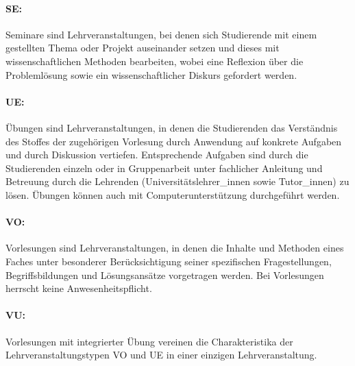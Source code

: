 \paragraph{SE:} Seminare sind Lehrveranstaltungen, bei denen sich
Studierende mit einem gestellten Thema oder Projekt auseinander setzen
und dieses mit wissenschaftlichen Methoden bearbeiten, wobei eine
Reflexion über die Problemlösung sowie ein wissenschaftlicher Diskurs
gefordert werden.

\paragraph{UE:} Übungen sind Lehrveranstaltungen, in denen die
Studierenden das Verständnis des Stoffes der zugehörigen Vorlesung
durch Anwendung auf konkrete Aufgaben und durch Diskussion
vertiefen. Entsprechende Aufgaben sind durch die Studierenden einzeln
oder in Gruppenarbeit unter fachlicher Anleitung und Betreuung durch
die Lehrenden (Universitätslehrer\_innen sowie Tutor\_innen) zu lösen.
Übungen können auch mit Computerunterstützung durchgeführt werden.

\paragraph{VO:} Vorlesungen sind Lehrveranstaltungen, in denen die
Inhalte und Methoden eines Faches unter besonderer Berücksichtigung
seiner spezifischen Fragestellungen, Begriffsbildungen und
Lösungsansätze vorgetragen werden. Bei Vorlesungen herrscht keine
Anwesenheitspflicht.

\paragraph{VU:} Vorlesungen mit integrierter Übung vereinen die
Charakteristika der Lehrveranstaltungstypen VO und UE in einer
einzigen Lehrveranstaltung.



